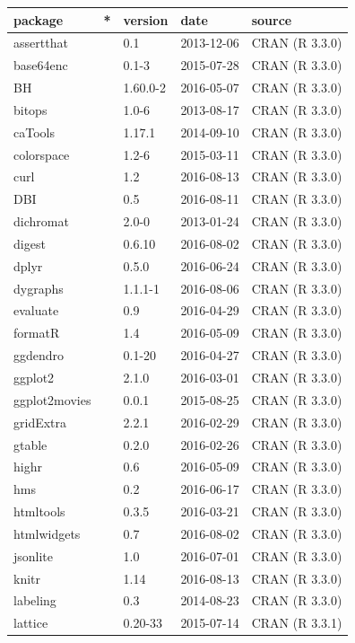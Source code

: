 \documentclass[]{tufte-book}
\begin{document}
\begin{longtable}{lllll}
\toprule
package & * & version & date & source\\
\midrule
assertthat &  & 0.1 & 2013-12-06 & CRAN (R 3.3.0)\\
base64enc &  & 0.1-3 & 2015-07-28 & CRAN (R 3.3.0)\\
BH &  & 1.60.0-2 & 2016-05-07 & CRAN (R 3.3.0)\\
bitops &  & 1.0-6 & 2013-08-17 & CRAN (R 3.3.0)\\
caTools &  & 1.17.1 & 2014-09-10 & CRAN (R 3.3.0)\\
\addlinespace
colorspace &  & 1.2-6 & 2015-03-11 & CRAN (R 3.3.0)\\
curl &  & 1.2 & 2016-08-13 & CRAN (R 3.3.0)\\
DBI &  & 0.5 & 2016-08-11 & CRAN (R 3.3.0)\\
dichromat &  & 2.0-0 & 2013-01-24 & CRAN (R 3.3.0)\\
digest &  & 0.6.10 & 2016-08-02 & CRAN (R 3.3.0)\\
\addlinespace
dplyr &  & 0.5.0 & 2016-06-24 & CRAN (R 3.3.0)\\
dygraphs &  & 1.1.1-1 & 2016-08-06 & CRAN (R 3.3.0)\\
evaluate &  & 0.9 & 2016-04-29 & CRAN (R 3.3.0)\\
formatR &  & 1.4 & 2016-05-09 & CRAN (R 3.3.0)\\
ggdendro &  & 0.1-20 & 2016-04-27 & CRAN (R 3.3.0)\\
\addlinespace
ggplot2 &  & 2.1.0 & 2016-03-01 & CRAN (R 3.3.0)\\
ggplot2movies &  & 0.0.1 & 2015-08-25 & CRAN (R 3.3.0)\\
gridExtra &  & 2.2.1 & 2016-02-29 & CRAN (R 3.3.0)\\
gtable &  & 0.2.0 & 2016-02-26 & CRAN (R 3.3.0)\\
highr &  & 0.6 & 2016-05-09 & CRAN (R 3.3.0)\\
\addlinespace
hms &  & 0.2 & 2016-06-17 & CRAN (R 3.3.0)\\
htmltools &  & 0.3.5 & 2016-03-21 & CRAN (R 3.3.0)\\
htmlwidgets &  & 0.7 & 2016-08-02 & CRAN (R 3.3.0)\\
jsonlite &  & 1.0 & 2016-07-01 & CRAN (R 3.3.0)\\
knitr &  & 1.14 & 2016-08-13 & CRAN (R 3.3.0)\\
\addlinespace
labeling &  & 0.3 & 2014-08-23 & CRAN (R 3.3.0)\\
lattice &  & 0.20-33 & 2015-07-14 & CRAN (R 3.3.1)\\

\end{longtable}
\end{document}
